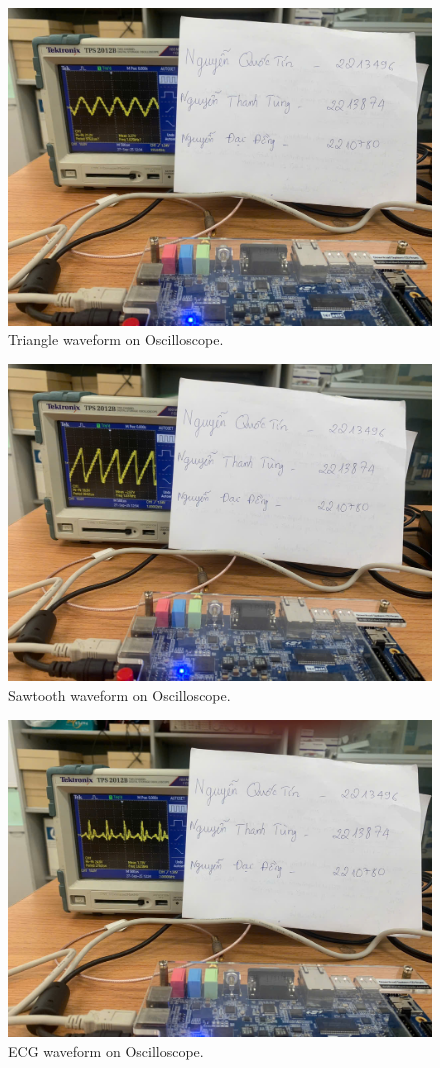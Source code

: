 \begin{figure}[H]
	\centering
	\includegraphics[width=.9\linewidth]{./my-chapters/my-images/Gen_wave/hinh5.jpg}
	\caption{Triangle waveform on Oscilloscope.}
\end{figure}

\begin{figure}[H]
	\centering
	\includegraphics[width=.9\linewidth]{./my-chapters/my-images/Gen_wave/hinh4.jpg}
	\caption{Sawtooth waveform on Oscilloscope.}
\end{figure}

\begin{figure}[H]
	\centering
	\includegraphics[width=.9\linewidth]{./my-chapters/my-images/Gen_wave/hinh3.jpg}
	\caption{ECG waveform on Oscilloscope.}
\end{figure}
